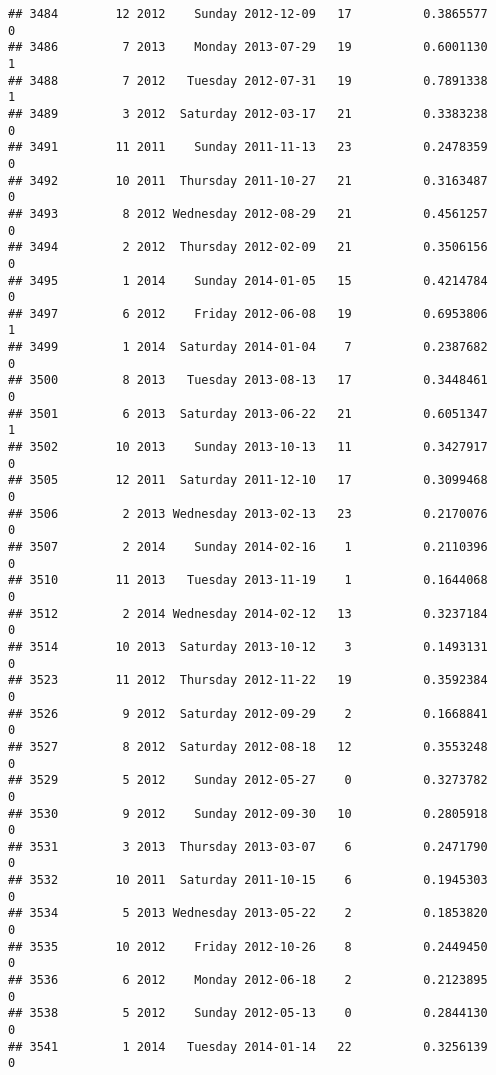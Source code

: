 \documentclass[
]{article}
\begin{document}
\begin{verbatim}
## 3484        12 2012    Sunday 2012-12-09   17          0.3865577             0
## 3486         7 2013    Monday 2013-07-29   19          0.6001130             1
## 3488         7 2012   Tuesday 2012-07-31   19          0.7891338             1
## 3489         3 2012  Saturday 2012-03-17   21          0.3383238             0
## 3491        11 2011    Sunday 2011-11-13   23          0.2478359             0
## 3492        10 2011  Thursday 2011-10-27   21          0.3163487             0
## 3493         8 2012 Wednesday 2012-08-29   21          0.4561257             0
## 3494         2 2012  Thursday 2012-02-09   21          0.3506156             0
## 3495         1 2014    Sunday 2014-01-05   15          0.4214784             0
## 3497         6 2012    Friday 2012-06-08   19          0.6953806             1
## 3499         1 2014  Saturday 2014-01-04    7          0.2387682             0
## 3500         8 2013   Tuesday 2013-08-13   17          0.3448461             0
## 3501         6 2013  Saturday 2013-06-22   21          0.6051347             1
## 3502        10 2013    Sunday 2013-10-13   11          0.3427917             0
## 3505        12 2011  Saturday 2011-12-10   17          0.3099468             0
## 3506         2 2013 Wednesday 2013-02-13   23          0.2170076             0
## 3507         2 2014    Sunday 2014-02-16    1          0.2110396             0
## 3510        11 2013   Tuesday 2013-11-19    1          0.1644068             0
## 3512         2 2014 Wednesday 2014-02-12   13          0.3237184             0
## 3514        10 2013  Saturday 2013-10-12    3          0.1493131             0
## 3523        11 2012  Thursday 2012-11-22   19          0.3592384             0
## 3526         9 2012  Saturday 2012-09-29    2          0.1668841             0
## 3527         8 2012  Saturday 2012-08-18   12          0.3553248             0
## 3529         5 2012    Sunday 2012-05-27    0          0.3273782             0
## 3530         9 2012    Sunday 2012-09-30   10          0.2805918             0
## 3531         3 2013  Thursday 2013-03-07    6          0.2471790             0
## 3532        10 2011  Saturday 2011-10-15    6          0.1945303             0
## 3534         5 2013 Wednesday 2013-05-22    2          0.1853820             0
## 3535        10 2012    Friday 2012-10-26    8          0.2449450             0
## 3536         6 2012    Monday 2012-06-18    2          0.2123895             0
## 3538         5 2012    Sunday 2012-05-13    0          0.2844130             0
## 3541         1 2014   Tuesday 2014-01-14   22          0.3256139             0

\end{verbatim}
\end{document}
